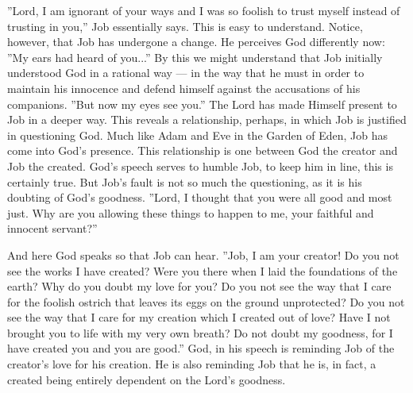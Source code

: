 ''Lord, I am ignorant of your ways and I was so foolish to trust myself instead of trusting in you,'' Job essentially says. This is easy to understand. Notice, however, that Job has undergone a change. He perceives God differently now: ''My ears had heard of you...'' By this we might understand that Job initially understood God in a rational way --- in the way that he must in order to maintain his innocence and defend himself against the accusations of his companions. ''But now my eyes see you.'' The Lord has made Himself present to Job in a deeper way. This reveals a relationship, perhaps, in which Job is justified in questioning God. Much like Adam and Eve in the Garden of Eden, Job has come into God's presence. This relationship is one between God the creator and Job the created. God's speech serves to humble Job, to keep him in line, this is certainly true. But Job's fault is not so much the questioning, as it is his doubting of God's goodness. ''Lord, I thought that you were all good and most just. Why are you allowing these things to happen to me, your faithful and innocent servant?''

And here God speaks so that Job can hear. ''Job, I am your creator! Do you not see the works I have created? Were you there when I laid the foundations of the earth? Why do you doubt my love for you? Do you not see the way that I care for the foolish ostrich that leaves its eggs on the ground unprotected? Do you not see the way that I care for my creation which I created out of love? Have I not brought you to life with my very own breath? Do not doubt my goodness, for I have created you and you are good.'' God, in his speech is reminding Job of the creator's love for his creation. He is also reminding Job that he is, in fact, a created being entirely dependent on the Lord's goodness.

